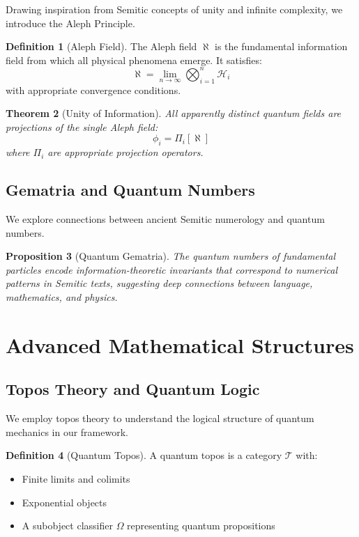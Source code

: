 \documentclass[12pt,a4paper]{article}
\newcommand{\Hilb}{\mathcal{H}}
\theoremstyle{plain}
\newtheorem{theorem}{Theorem}[section]
\newtheorem{proposition}[theorem]{Proposition}
\theoremstyle{definition}
\newtheorem{definition}[theorem]{Definition}
\theoremstyle{remark}
\begin{document}
Drawing inspiration from Semitic concepts of unity and infinite complexity, we introduce the Aleph Principle.

\begin{definition}[Aleph Field]
The Aleph field $\aleph$ is the fundamental information field from which all physical phenomena emerge. It satisfies:
\[\aleph = \lim_{n \to \infty} \bigotimes_{i=1}^n \Hilb_i\]
with appropriate convergence conditions.
\end{definition}

\begin{theorem}[Unity of Information]
All apparently distinct quantum fields are projections of the single Aleph field:
\[\phi_i = \Pi_i[\aleph]\]
where $\Pi_i$ are appropriate projection operators.
\end{theorem}

\subsection{Gematria and Quantum Numbers}

We explore connections between ancient Semitic numerology and quantum numbers.

\begin{proposition}[Quantum Gematria]
The quantum numbers of fundamental particles encode information-theoretic invariants that correspond to numerical patterns in Semitic texts, suggesting deep connections between language, mathematics, and physics.
\end{proposition}

\section{Advanced Mathematical Structures}

\subsection{Topos Theory and Quantum Logic}

We employ topos theory to understand the logical structure of quantum mechanics in our framework.

\begin{definition}[Quantum Topos]
A quantum topos is a category $\mathcal{T}$ with:
\begin{itemize}
\item Finite limits and colimits
\item Exponential objects
\item A subobject classifier $\Omega$ representing quantum propositions
\end{itemize}
\end{definition}
\end{document}
